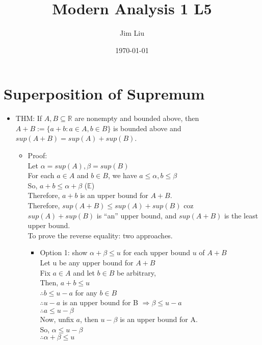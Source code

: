 \documentclass[11pt]{article}
\author{Jim Liu}
\date{\today}
\title{Modern Analysis 1 L5}
\begin{document}
\maketitle
\tableofcontents

\section{Superposition of Supremum}
\label{sec:orgd682576}
\begin{itemize}
\item THM: If \(A, B \subseteq \mathbb{R}\) are nonempty and bounded above, then \(A + B := \{a + b : a\in A, b\in B\}\) is bounded above and \(sup(A + B) = sup(A) + sup(B)\).
\begin{itemize}
\item Proof:\\[0pt]
Let \(\alpha = sup(A), \beta = sup(B)\)\\[0pt]
For each \(a \in A\) and \(b \in B\), we have \(a \leq \alpha, b \leq \beta\) \\[0pt]
So, \(a+b \leq \alpha + \beta\) (\(\mathbb{E}\))\\[0pt]
Therefore, \(a+b\) is an upper bound for \(A + B\).\\[0pt]
Therefore, \(sup(A+B) \leq sup(A)+sup(B)\) coz \(sup(A) + sup(B)\) is ``an'' upper bound, and \(sup(A+B)\) is the least upper bound.\\[0pt]
To prove the reverse equality: two approaches.\\[0pt]
\begin{itemize}
\item Option 1: show \(\alpha + \beta \leq u\) for each upper bound \(u\) of \(A + B\)\\[0pt]
Let u be any upper bound for \(A + B\)\\[0pt]
Fix \(a\in A\) and let \(b \in B\) be arbitrary,\\[0pt]
Then, \(a + b \leq u\)\\[0pt]
\(\therefore b \leq u-a\) for any \(b \in B\)\\[0pt]
\(\therefore u - a\) is an upper bound for B \(\Rightarrow \beta \leq u - a\)\\[0pt]
\(\therefore a \leq u - \beta\)\\[0pt]
Now, unfix \(a\), then \(u-\beta\) is an upper bound for A.\\[0pt]
So, \(\alpha \leq u - \beta\)\\[0pt]
\(\therefore \alpha + \beta \leq u\)\\[0pt]

\end{itemize}
\end{itemize}
\end{itemize}
\end{document}
